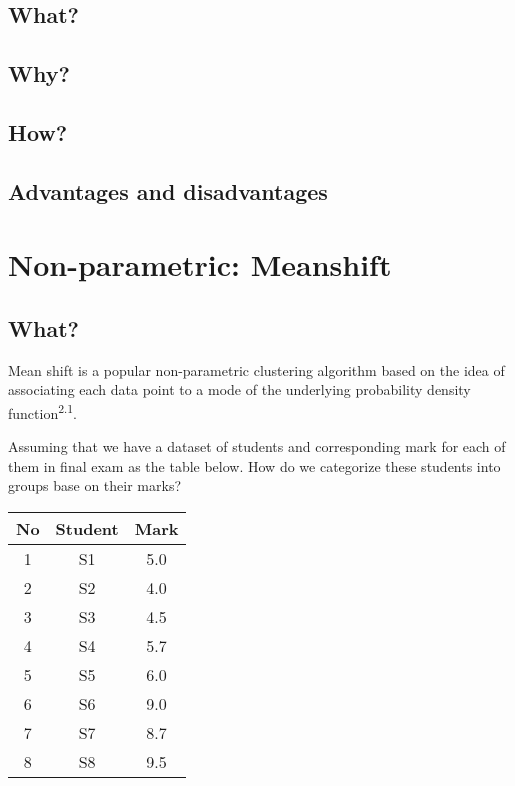 \documentclass[13pt,a4paper]{report}
\begin{document}
\subsection{What?}

\subsection{Why?}

\subsection{How?}

\subsection{Advantages and disadvantages}


\section{Non-parametric: Meanshift}

\subsection{What?}

Mean shift  is a popular non-parametric clustering algorithm based on the
idea of associating each data point to a mode of the underlying probability density
function\textsuperscript{2.1}.{\linebreak}

Assuming that we have a dataset of students and corresponding mark for each of them 
in final exam as the table below. How do we categorize these students into groups base on their marks?
\begin{center}
 \begin{tabular}{||c c c||} 
 \hline
 No & Student & Mark \\ [0.5ex] 
 \hline\hline
 1 & S1 & 5.0 \\ 
 \hline
 2 & S2 & 4.0 \\
 \hline
 3 & S3 & 4.5 \\
 \hline
 4 & S4 & 5.7 \\
 \hline
 5 & S5 & 6.0 \\ 
  \hline
 6 & S6 & 9.0 \\ 
  \hline
 7 & S7 & 8.7 \\ 
  \hline
 8 & S8 & 9.5 \\ 
 [1ex] 
 \hline
\end{tabular}
\end{center}
\end{document}
